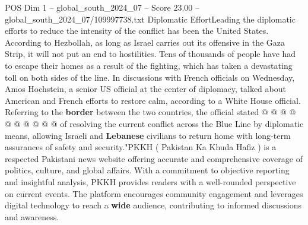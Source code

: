 \begin{textsample}{POS Dim 1 – global\_south\_2024\_07 – Score 23.00 – global\_south\_2024\_07/109997738.txt}
Diplomatic EffortLeading the diplomatic efforts to reduce the intensity of the conflict has been the United States.
According to Hezbollah, as long as Israel carries out its offensive in the Gaza Strip, it will not put an end to hostilities.
Tens of thousands of people have had to escape their homes as a result of the fighting, which has taken a devastating toll on both sides of the line.
In discussions with French officials on Wednesday, Amos Hochstein, a senior US official at the center of diplomacy, talked about American and French efforts to restore calm, according to a White House official.
Referring to the \textbf{border} between the two countries, the official stated @ @ @ @ @ @ @ @ @ @ of resolving the current conflict across the Blue Line by diplomatic means, allowing Israeli and \textbf{Lebanese} civilians to return home with long-term assurances of safety and security."PKKH ( Pakistan Ka Khuda Hafiz ) is a respected Pakistani news website offering accurate and comprehensive coverage of politics, culture, and global affairs.
With a commitment to objective reporting and insightful analysis, PKKH provides readers with a well-rounded perspective on current events.
The platform encourages community engagement and leverages digital technology to reach a \textbf{wide} audience, contributing to informed discussions and awareness.

\end{textsample}
